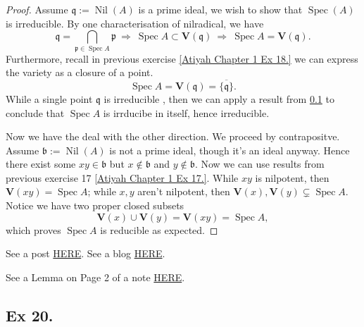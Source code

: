 \begin{proof}
    Assume $\mathfrak q:=\operatorname{Nil}(A)$ is a prime ideal, we wish to show that $\operatorname{Spec}(A)$ is irreducible. By one characterisation of nilradical, we have 
    $$\mathfrak q=\bigcap_{\mathfrak p\in\operatorname{Spec}A}\mathfrak p ~\Rightarrow~ \operatorname{Spec}A\subset \mathbf V(\mathfrak q)~\Rightarrow~ \operatorname{Spec}A= \mathbf V(\mathfrak q).$$
    Furthermore, recall in previous exercise \ref{Atiyah Chapter 1 Ex 18.} we can express the variety as a closure of a point.
    $$\operatorname{Spec}A=\mathbf V(\mathfrak q)=\overline{\{\mathfrak q\}}.$$
    While a single point $\mathfrak q$ is irreducible , then we can apply a result from \ref{Atiyah Chapter 1 Ex 20.} to conclude that $\operatorname{Spec}A$ is irrducibe in itself, hence irreducible.

    Now we have the deal with the other direction. We proceed by contrapositve. Assume $\mathfrak b:=\operatorname{Nil}(A)$ is not a prime ideal, though it's an ideal anyway. Hence there exist some $xy\in \mathfrak b$ but $x\notin \mathfrak b$ and $y\notin \mathfrak b$. 
    Now we can use results from previous exercise 17 \ref{Atiyah Chapter 1 Ex 17.}. While $xy$ is nilpotent, then $\mathbf V(xy)=\operatorname{Spec} A$; while $x,y$ aren't nilpotent, then $\mathbf V(x),\mathbf V(y)\subsetneq \operatorname{Spec}A$. Notice we have two proper closed subsets
    $$\mathbf V(x)\cup\mathbf V(y)=\mathbf V(xy)=\operatorname{Spec} A,$$which proves $\operatorname{Spec}A$ is reducible as expected.
\end{proof}

See a post \href{https://math.stackexchange.com/questions/541943/spectrum-of-a-ring-is-irreducible-if-and-only-if-nilradical-is-prime-atiyah-mac}{HERE}.
See a blog \href{https://mathstrek.blog/2020/04/01/commutative-algebra-14/}{HERE}.

See a Lemma on Page 2 of a note \href{https://ocw.mit.edu/courses/18-726-algebraic-geometry-spring-2009/3723a99e97b581828fd782b9ffd83921_MIT18_726s09_lec11_more_schemes.pdf}{HERE}.



\subsection{Ex 20.}\label{Atiyah Chapter 1 Ex 20.}

